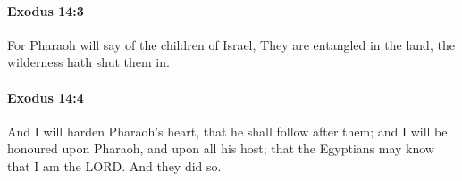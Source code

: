 		\paragraph{Exodus 14:3} %
			\label{EXODUS-14-3}

			For Pharaoh will say of the children of Israel, They are entangled in the land, the wilderness hath shut them in.


		\paragraph{Exodus 14:4} %
			\label{EXODUS-14-4}

			And I will harden Pharaoh's heart, that he shall follow after them; and I will be honoured upon Pharaoh, and upon all his host; that the Egyptians may know that I am the LORD. And they did so.


